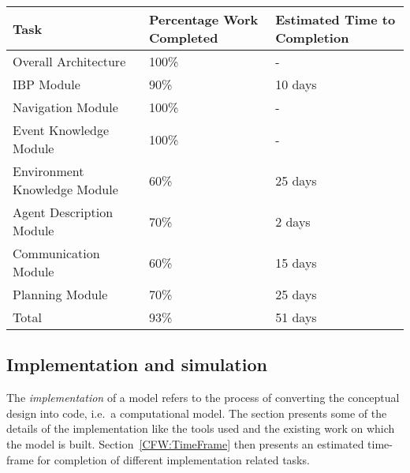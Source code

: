 \begin{table}[tbp]
\centering
{} %
\begin{tabular}{p{2.5in}   p{1.25in}   p{1.25in}} %
\hline\hline %
Task & Percentage Work Completed & Estimated Time to Completion \\
\hline
Overall Architecture  & 100\% & - \\[3pt]
IBP Module  & 90\% & 10 days \\[3pt]
Navigation Module  & 100\% & - \\[3pt]
Event Knowledge Module & 100\% & - \\[3pt]
Environment Knowledge Module & 60\% & 25 days \\[3pt]
Agent Description Module  & 70\% & 2 days \\[3pt]
Communication Module  & 60\% & 15 days \\[3pt]
Planning Module  & 70\% & 25 days \\[3pt]
\hline
Total  & 93\% & 51 days \\[3pt]
\hline
\end{tabular}
\label{tab:ModelDesign}
\end{table}


\subsection{Implementation and simulation}
\label{CFW:Implementation}

The \emph{implementation} of a model refers to the process of converting the conceptual design into code, i.e.\ a computational model. The section presents some of the details of the implementation like the tools used and the existing work on which the model is built. Section~\ref{CFW:TimeFrame} then presents an estimated time-frame for completion of different implementation related tasks.


